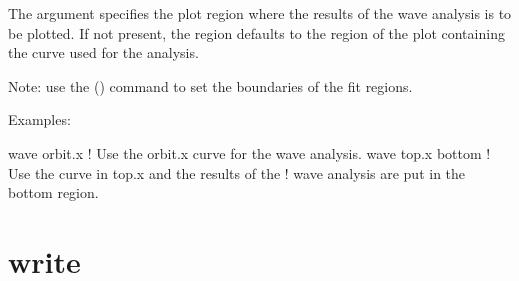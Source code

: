 {{{{{{{{{The  argument specifies the plot region where the results of the wave analysis
is to be plotted. If not present, the region defaults to the region of the plot containing the curve
used for the analysis.

Note: use the  () command to set the boundaries of the fit regions.

Examples:
\begin{example}
  wave orbit.x      ! Use the orbit.x curve for the wave analysis.
  wave top.x bottom ! Use the curve in top.x and the results of the 
                    !  wave analysis are put in the bottom region.
\end{example}


\section{write}
\label{s:write}

}}}}}}}}}
